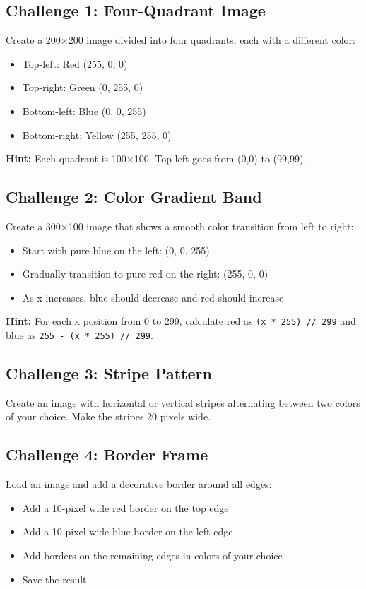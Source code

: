 \documentclass[11pt]{article}
\begin{document}
\subsection*{Challenge 1: Four-Quadrant Image}

Create a 200×200 image divided into four quadrants, each with a different color:

\begin{itemize}
    \item Top-left: Red (255, 0, 0)
    \item Top-right: Green (0, 255, 0)
    \item Bottom-left: Blue (0, 0, 255)
    \item Bottom-right: Yellow (255, 255, 0)
\end{itemize}

\textbf{Hint:} Each quadrant is 100×100. Top-left goes from (0,0) to (99,99).

\subsection*{Challenge 2: Color Gradient Band}

Create a 300×100 image that shows a smooth color transition from left to right:
\begin{itemize}
    \item Start with pure blue on the left: (0, 0, 255)
    \item Gradually transition to pure red on the right: (255, 0, 0)
    \item As x increases, blue should decrease and red should increase
\end{itemize}

\textbf{Hint:} For each x position from 0 to 299, calculate red as \texttt{(x * 255) // 299} and blue as \texttt{255 - (x * 255) // 299}.

\subsection*{Challenge 3: Stripe Pattern}

Create an image with horizontal or vertical stripes alternating between two colors of your choice. Make the stripes 20 pixels wide.

\subsection*{Challenge 4: Border Frame}

Load an image and add a decorative border around all edges:
\begin{itemize}
    \item Add a 10-pixel wide red border on the top edge
    \item Add a 10-pixel wide blue border on the left edge
    \item Add borders on the remaining edges in colors of your choice
    \item Save the result
\end{itemize}
\end{document}
